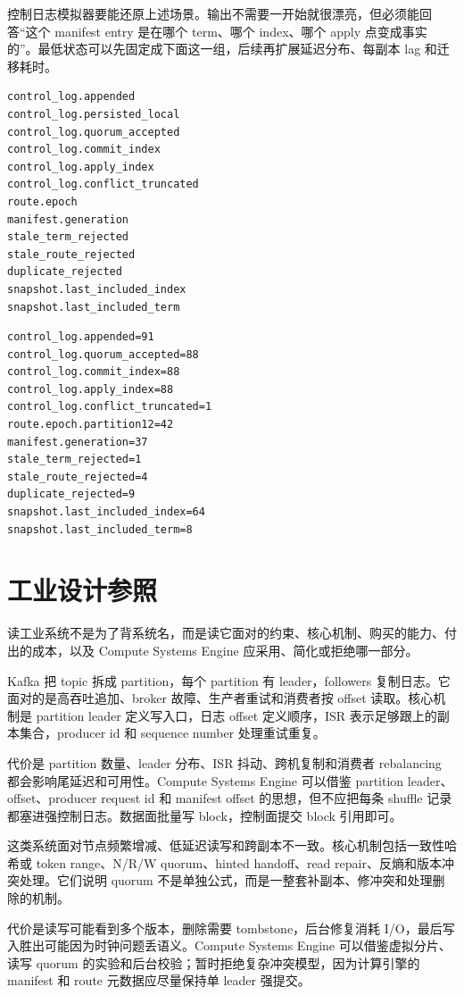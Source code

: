 控制日志模拟器要能还原上述场景。输出不需要一开始就很漂亮，但必须能回答“这个 manifest entry 是在哪个 term、哪个 index、哪个 apply 点变成事实的”。最低状态可以先固定成下面这一组，后续再扩展延迟分布、每副本 lag 和迁移耗时。

\begin{lstlisting}[numbers=none,caption={控制日志报告字段}]
control_log.appended
control_log.persisted_local
control_log.quorum_accepted
control_log.commit_index
control_log.apply_index
control_log.conflict_truncated
route.epoch
manifest.generation
stale_term_rejected
stale_route_rejected
duplicate_rejected
snapshot.last_included_index
snapshot.last_included_term
\end{lstlisting}

\begin{lstlisting}[numbers=none,caption={控制日志报告摘要示例}]
control_log.appended=91
control_log.quorum_accepted=88
control_log.commit_index=88
control_log.apply_index=88
control_log.conflict_truncated=1
route.epoch.partition12=42
manifest.generation=37
stale_term_rejected=1
stale_route_rejected=4
duplicate_rejected=9
snapshot.last_included_index=64
snapshot.last_included_term=8
\end{lstlisting}

\section{工业设计参照}

读工业系统不是为了背系统名，而是读它面对的约束、核心机制、购买的能力、付出的成本，以及 Compute Systems Engine 应采用、简化或拒绝哪一部分。

\begin{casebox}
Kafka 把 topic 拆成 partition，每个 partition 有 leader，followers 复制日志。它面对的是高吞吐追加、broker 故障、生产者重试和消费者按 offset 读取。核心机制是 partition leader 定义写入口，日志 offset 定义顺序，ISR 表示足够跟上的副本集合，producer id 和 sequence number 处理重试重复。

代价是 partition 数量、leader 分布、ISR 抖动、跨机复制和消费者 rebalancing 都会影响尾延迟和可用性。Compute Systems Engine 可以借鉴 partition leader、offset、producer request id 和 manifest offset 的思想，但不应把每条 shuffle 记录都塞进强控制日志。数据面批量写 block，控制面提交 block 引用即可。
\end{casebox}

\begin{casebox}
这类系统面对节点频繁增减、低延迟读写和跨副本不一致。核心机制包括一致性哈希或 token range、N/R/W quorum、hinted handoff、read repair、反熵和版本冲突处理。它们说明 quorum 不是单独公式，而是一整套补副本、修冲突和处理删除的机制。

代价是读写可能看到多个版本，删除需要 tombstone，后台修复消耗 I/O，最后写入胜出可能因为时钟问题丢语义。Compute Systems Engine 可以借鉴虚拟分片、读写 quorum 的实验和后台校验；暂时拒绝复杂冲突模型，因为计算引擎的 manifest 和 route 元数据应尽量保持单 leader 强提交。
\end{casebox}


